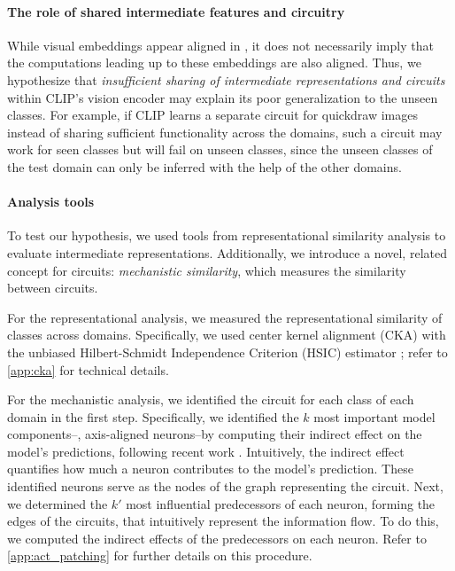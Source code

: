 \paragraph{The role of shared intermediate features and circuitry}
While visual embeddings appear aligned in , it does not necessarily imply that the computations leading up to these embeddings are also aligned. Thus, we hypothesize that \emph{insufficient sharing of intermediate representations and circuits} \citep{hohman2019summit,olah2020zoom} within CLIP's vision encoder may explain its poor generalization to the unseen classes. For example, if CLIP learns a separate circuit for quickdraw images instead of sharing sufficient functionality across the domains, such a circuit may work for seen classes but will fail on unseen classes, since the unseen classes of the test domain can only be inferred with the help of the other domains.

\paragraph{Analysis tools}
To test our hypothesis, we used tools from representational similarity analysis to evaluate intermediate representations. Additionally, we introduce a novel, related concept for circuits: \emph{mechanistic similarity}, which measures the similarity between circuits.

For the representational analysis, we measured the representational similarity of classes across domains. Specifically, we used center kernel alignment (CKA) \citep{kornblith2019similarity} with the unbiased Hilbert-Schmidt Independence Criterion (HSIC) estimator \citep{song2012feature}; refer to \cref{app:cka} for technical details.

For the mechanistic analysis, we identified the circuit for each class of each domain in the first step. Specifically, we identified the $k$ most important model components--\ie, axis-aligned neurons--by computing their indirect effect \citep{pearl2001direct} on the model's predictions, following recent work \citep{vig2020investigating,schrodi2022towards,meng2022locating,marks2024sparse}. Intuitively, the indirect effect quantifies how much a neuron contributes to the model's prediction. These identified neurons serve as the nodes of the graph representing the circuit. Next, we determined the $k'$ most influential predecessors of each neuron, forming the edges of the circuits, that intuitively represent the information flow. To do this, we computed the indirect effects of the predecessors on each neuron. Refer to \cref{app:act_patching} for further details on this procedure.

